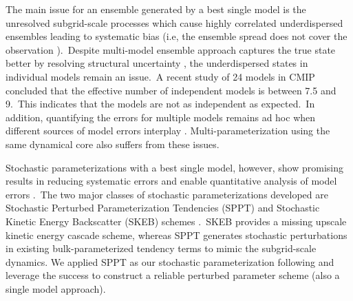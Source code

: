 	The main issue for an ensemble generated by a best single model is the unresolved subgrid-scale processes which cause
	highly correlated underdispersed ensembles leading to systematic bias {\citep{Palmer01, Stensrud00}}  
	(i.e, the ensemble spread does not cover the observation {\citep{Buizza05}}).\
	Despite multi-model ensemble approach captures the true state better by resolving structural uncertainty {\citep{Tebaldi07}},
	the underdispersed states in individual models remain an issue.\
	A recent study of 24 models in CMIP {\citep{Pennell11}} concluded that
	the effective number of independent models is between 7.5 and 9.\ 
	This indicates that the models are not as independent as expected.\
	In addition, quantifying the errors for multiple models remains ad hoc when
	different sources of model errors interplay {\citep{Palmer09}}.
	Multi-parameterization {\citep{Houtekamer96}} using the 
	same dynamical core also suffers from these issues.\ %

	Stochastic parameterizations with a best single model, however, show promising results
	in reducing systematic errors and enable quantitative analysis of model errors 
	{\citep{Palmer09, Berner09, Arnold13}}.\
	The two major classes of stochastic parameterizations developed are 
	Stochastic Perturbed Parameterization Tendencies (SPPT) {\citep{Buizza99}}  
	and Stochastic Kinetic Energy Backscatter (SKEB) schemes
	{\citep{Shutts05, Berner09, Bowler09}}.\
	SKEB provides a missing upscale kinetic energy cascade scheme, whereas
	SPPT generates stochastic perturbations in existing bulk-parameterized tendency 
	terms to mimic the subgrid-scale dynamics.
	We applied SPPT as our stochastic parameterization following \citet{Arnold13} 
	and leverage the success to construct a reliable perturbed parameter scheme (also a single model approach). 


